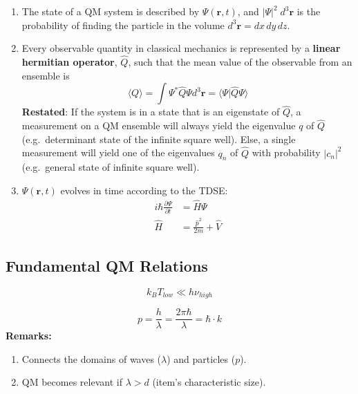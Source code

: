 \begin{enumerate}
    \item The state of a QM system is described by $\Psi(\mathbf{r},t)$, and $|\Psi|^2\; d^3 \mathbf{r}$ is the probability of finding the particle in the volume $d^3 \mathbf{r} = dx\,dy\,dz$.
    \item Every observable quantity in classical mechanics is represented by a \textbf{linear hermitian operator}, $\hat{Q}$, such that the mean value of the observable from an ensemble is
          \noindent\begin{equation*}
              \langle Q\rangle=\int\Psi^{*}\hat{Q}\Psi d^{3} \mathbf{r}= \langle\Psi|\hat{Q}\Psi\rangle
          \end{equation*}\newline
          \textbf{Restated}:\newline
          If the system is in a state that is an eigenstate of $\hat{Q}$, a measurement on a QM ensemble will always yield the eigenvalue $q$ of $\hat{Q}$ (e.g.\ determinant state of the infinite square well).\newline
          Else, a single measurement will yield one of the eigenvalues $q_n$ of $\hat{Q}$ with probability $|c_n|^2$ (e.g.\ general state of infinite square well).
    \item $\Psi(\mathbf{r},t)$ evolves in time according to the TDSE:
          \noindent\begin{align*}
              i\hbar \frac{\partial \Psi}{\partial t} & =\hat{H}\Psi                     \\
              \hat{H}                                 & = \frac{\hat{p}^2}{2m} + \hat{V}
          \end{align*}
\end{enumerate}

\subsection{Fundamental QM Relations}


\begin{equation*}
    k_B T_{low} \ll h\nu_{high}
\end{equation*}


\begin{equation*}
    p=\frac{h}{\lambda}=\frac{2\pi\hbar}{\lambda}=\hbar\cdot k
\end{equation*}
\textbf{Remarks:}
\begin{enumerate}
    \item Connects the domains of waves ($\lambda$) and particles ($p$).
    \item QM becomes relevant if $\lambda>d$ (item's characteristic size).
\end{enumerate}

